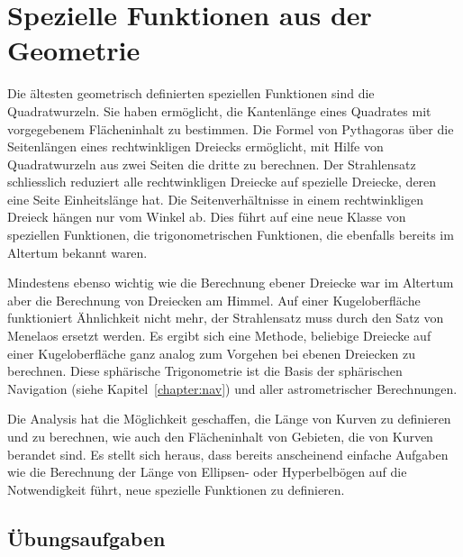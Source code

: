 %
%
%
\chapter{Spezielle Funktionen aus der Geometrie
\label{buch:chapter:geometrie}}

Die ältesten geometrisch definierten speziellen Funktionen
sind die Quadratwurzeln.
Sie haben ermöglicht, die Kantenlänge eines Quadrates mit vorgegebenem
Flächeninhalt zu bestimmen.
Die Formel von Pythagoras über die Seitenlängen eines rechtwinkligen
Dreiecks ermöglicht, mit Hilfe von Quadratwurzeln aus zwei Seiten
die dritte zu berechnen.
Der Strahlensatz schliesslich reduziert alle rechtwinkligen
Dreiecke auf spezielle Dreiecke, deren eine Seite Einheitslänge 
hat.
Die Seitenverhältnisse in einem rechtwinkligen Dreieck hängen nur 
vom Winkel ab.
Dies führt auf eine neue Klasse von speziellen Funktionen,
die trigonometrischen Funktionen,
die ebenfalls bereits im Altertum bekannt waren.

Mindestens ebenso wichtig wie die Berechnung ebener Dreiecke
war im Altertum aber die Berechnung von Dreiecken am Himmel.
Auf einer Kugeloberfläche funktioniert Ähnlichkeit nicht mehr,
der Strahlensatz muss durch den Satz von Menelaos ersetzt werden.
Es ergibt sich eine Methode, beliebige Dreiecke auf einer Kugeloberfläche
ganz analog zum Vorgehen bei ebenen Dreiecken zu berechnen.
Diese sphärische Trigonometrie ist die Basis der sphärischen Navigation
(siehe Kapitel~\ref{chapter:nav})
und aller astrometrischer Berechnungen.

Die Analysis hat die Möglichkeit geschaffen, die Länge von Kurven
zu definieren und zu berechnen, wie auch den Flächeninhalt von
Gebieten, die von Kurven berandet sind.
Es stellt sich heraus, dass bereits anscheinend einfache Aufgaben
wie die Berechnung der Länge von Ellipsen- oder Hyperbelbögen auf
die Notwendigkeit führt, neue spezielle Funktionen zu definieren.






\section*{Übungsaufgaben}
\begin{uebungsaufgaben}
\end{uebungsaufgaben}

